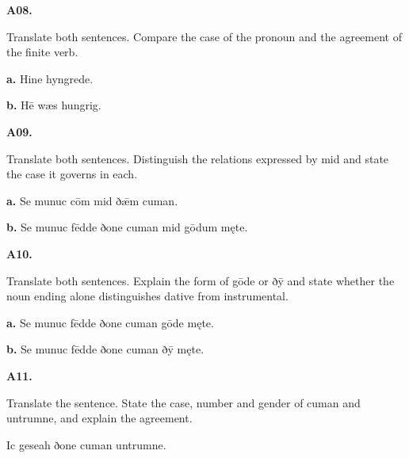 \par\begin{minipage}{\linewidth}\raggedright
\textbf{A08.}

Translate both sentences. Compare the case of the pronoun and the agreement of the finite verb.

\textbf{a.} Hine hyngrede.

\textbf{b.} Hē wæs hungrig.

\end{minipage}\par\addvspace{4pt}

\par\begin{minipage}{\linewidth}\raggedright
\textbf{A09.}

Translate both sentences. Distinguish the relations expressed by mid and state the case it governs in each.

\textbf{a.} Se munuc cōm mid ðǣm cuman.

\textbf{b.} Se munuc fēdde ðone cuman mid gōdum męte.

\end{minipage}\par\addvspace{4pt}

\par\begin{minipage}{\linewidth}\raggedright
\textbf{A10.}

Translate both sentences. Explain the form of gōde or ðȳ and state whether the noun ending alone distinguishes dative from instrumental.

\textbf{a.} Se munuc fēdde ðone cuman gōde męte.

\textbf{b.} Se munuc fēdde ðone cuman ðȳ męte.

\end{minipage}\par\addvspace{4pt}

\par\begin{minipage}{\linewidth}\raggedright
\textbf{A11.}

Translate the sentence. State the case, number and gender of cuman and untrumne, and explain the agreement.

Ic geseah ðone cuman untrumne.

\end{minipage}\par\addvspace{4pt}


